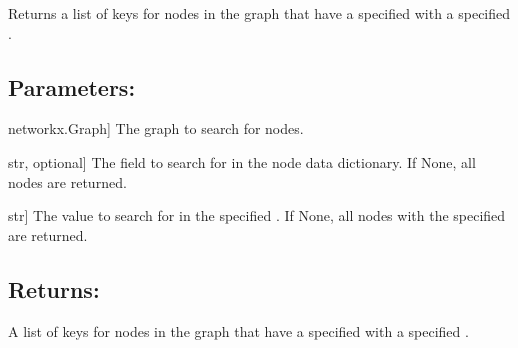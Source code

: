 \documentclass[letterpaper,10pt,english]{sphinxmanual}
\begin{document}

\begin{fulllineitems}
\label{\detokenize{pysewer:pysewer.helper.get_node_keys}}
\pysigstartsignatures
{}
\pysigstopsignatures
\sphinxAtStartPar
Returns a list of keys for nodes in the graph  that have a specified  with a specified .


\subsection{Parameters:}
\label{\detokenize{pysewer:id5}}\begin{description}
\sphinxlineitem{G}{[}networkx.Graph{]}
\sphinxAtStartPar
The graph to search for nodes.

\sphinxlineitem{field}{[}str, optional{]}
\sphinxAtStartPar
The field to search for in the node data dictionary. If None, all nodes are returned.

\sphinxlineitem{value}{[}str{]}
\sphinxAtStartPar
The value to search for in the specified . If None, all nodes with the specified  are returned.

\end{description}


\subsection{Returns:}
\label{\detokenize{pysewer:id6}}\begin{description}
\sphinxAtStartPar
A list of keys for nodes in the graph  that have a specified  with a specified .

\end{description}

\end{fulllineitems}
\end{document}
